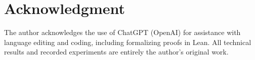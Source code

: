 \section*{Acknowledgment}
The author acknowledges the use of ChatGPT (OpenAI) for assistance with language editing and coding\ifArxivVersion, including formalizing proofs in Lean\fi. All technical results and recorded experiments are entirely the author's original work.

